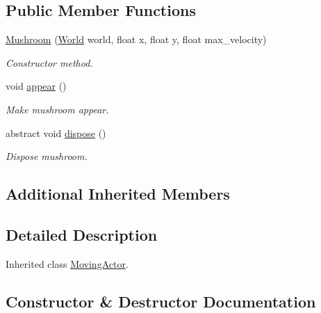 \subsection*{Public Member Functions}
\begin{DoxyCompactItemize}
\item 
\hyperlink{classnl_1_1arjanfrans_1_1mario_1_1model_1_1Mushroom_a0989b16e9c3061a514c25d1193c628e5}{Mushroom} (\hyperlink{classnl_1_1arjanfrans_1_1mario_1_1model_1_1World}{World} world, float x, float y, float max\+\_\+velocity)
\begin{DoxyCompactList}\small\item\em Constructor method. \end{DoxyCompactList}\item 
\mbox{\label{classnl_1_1arjanfrans_1_1mario_1_1model_1_1Mushroom_a79a92038e1a869bbfd696839442dbae5}} 
void \hyperlink{classnl_1_1arjanfrans_1_1mario_1_1model_1_1Mushroom_a79a92038e1a869bbfd696839442dbae5}{appear} ()
\begin{DoxyCompactList}\small\item\em Make mushroom appear. \end{DoxyCompactList}\item 
\mbox{\label{classnl_1_1arjanfrans_1_1mario_1_1model_1_1Mushroom_a145a3bd421ab31131a842ac9bab03021}} 
abstract void \hyperlink{classnl_1_1arjanfrans_1_1mario_1_1model_1_1Mushroom_a145a3bd421ab31131a842ac9bab03021}{dispose} ()
\begin{DoxyCompactList}\small\item\em Dispose mushroom. \end{DoxyCompactList}\end{DoxyCompactItemize}
\subsection*{Additional Inherited Members}


\subsection{Detailed Description}
Inherited class \hyperlink{classnl_1_1arjanfrans_1_1mario_1_1model_1_1MovingActor}{Moving\+Actor}. 

\subsection{Constructor \& Destructor Documentation}
\mbox{\label{classnl_1_1arjanfrans_1_1mario_1_1model_1_1Mushroom_a0989b16e9c3061a514c25d1193c628e5}} 
